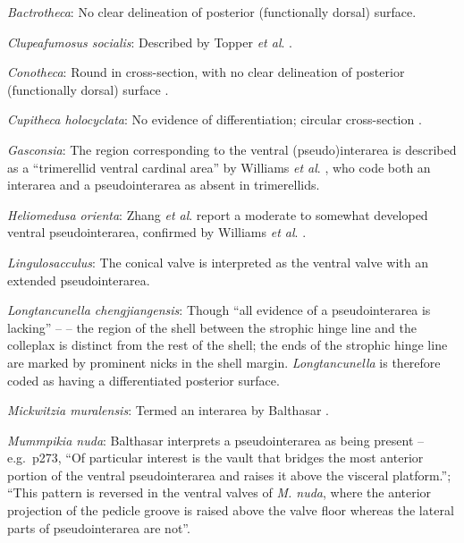 \documentclass[openany]{book}
\begin{document}
\hypertarget{Bactrotheca-coding-107}{}
\emph{Bactrotheca}: No clear delineation of posterior (functionally
dorsal) surface.

\hypertarget{Clupeafumosus_socialis-coding-107}{}
\emph{Clupeafumosus socialis}: Described by Topper \emph{et al}.
\citeyearpar{Topper2013Reappraisalof}.

\hypertarget{Conotheca-coding-107}{}
\emph{Conotheca}: Round in cross-section, with no clear delineation of
posterior (functionally dorsal) surface \citep{Devaere2014}.

\hypertarget{Cupitheca_holocyclata-coding-107}{}
\emph{Cupitheca holocyclata}: No evidence of differentiation; circular
cross-section \citep{Vendrasco2017}.

\hypertarget{Gasconsia-coding-107}{}
\emph{Gasconsia}: The region corresponding to the ventral
(pseudo)interarea is described as a ``trimerellid ventral cardinal
area'' by Williams \emph{et al}.
\citeyearpar[p.162]{Williams2000LinguliformeaCraniiformea}, who code
both an interarea and a pseudointerarea as absent in trimerellids.

\hypertarget{Heliomedusa_orienta-coding-107}{}
\emph{Heliomedusa orienta}: Zhang \emph{et al}.
\citeyearpar{Zhang2009Architectureand} report a moderate to somewhat
developed ventral pseudointerarea, confirmed by Williams \emph{et al}.
\citeyearpar{Williams2007Supplement}.

\hypertarget{Lingulosacculus-coding-107}{}
\emph{Lingulosacculus}: The conical valve is interpreted as the ventral
valve with an extended pseudointerarea.

\hypertarget{Longtancunella_chengjiangensis-coding-107}{}
\emph{Longtancunella chengjiangensis}: Though ``all evidence of a
pseudointerarea is lacking'' -- \citet{Zhang2011Theexceptionally} -- the
region of the shell between the strophic hinge line and the colleplax
\citep[fig. 2 in][]{Zhang2011Theexceptionally} is distinct from the rest
of the shell; the ends of the strophic hinge line are marked by
prominent nicks in the shell margin. \emph{Longtancunella} is therefore
coded as having a differentiated posterior surface.

\hypertarget{Mickwitzia_muralensis-coding-107}{}
\emph{Mickwitzia muralensis}: Termed an interarea by Balthasar
\citeyearpar{Balthasar2004Shellstructure}.

\hypertarget{Mummpikia_nuda-coding-107}{}
\emph{Mummpikia nuda}: Balthasar \citeyearpar{Balthasar2008iMummpikia}
interprets a pseudointerarea as being present -- e.g.~p273, ``Of
particular interest is the vault that bridges the most anterior portion
of the ventral pseudointerarea and raises it above the visceral
platform.''; ``This pattern is reversed in the ventral valves of
\emph{M. nuda}, where the anterior projection of the pedicle groove is
raised above the valve floor whereas the lateral parts of
pseudointerarea are not''.
\end{document}
